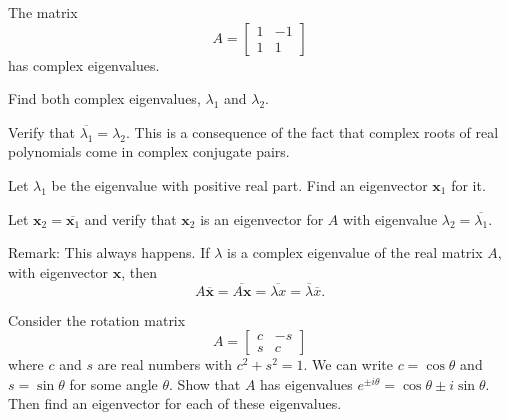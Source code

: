 \documentclass[minion]{homework}
\newcommand{\vx}{\mathbf{x}}
\begin{document}
\begin{aproblems}
\aproblem
The matrix
\[
A= \begin{bmatrix} 1 & -1 \\ 1 & 1 \end{bmatrix}
\]
has complex eigenvalues.
\begin{subproblems}
\item Find both complex eigenvalues, $\lambda_1$ and $\lambda_2$.
\item Verify that $\overline{\lambda_1}=\lambda_2$.  This 
is a consequence of the fact that complex roots of real polynomials come in complex conjugate pairs.  
\item Let $\lambda_1$ be the eigenvalue with positive real part.  Find
an eigenvector $\vx_1$ for it.
\item Let $\vx_2=\overline{\vx_1}$ and verify that $\vx_2$ is an eigenvector 
for $A$ with eigenvalue $\lambda_2=\overline{\lambda_1}$.

Remark: This always happens.  If $\lambda$ is a complex eigenvalue of the real matrix $A$, with eigenvector $\vx$, then 
\[
A\overline{\vx} = \overline{A\vx} = \overline{\lambda x} = \overline{\lambda} \overline{x}.
\]
\end{subproblems}

\aproblem Consider the rotation matrix
\[
A= \begin{bmatrix} c & -s \\ s & c \end{bmatrix}
\]
where $c$ and $s$ are real numbers with $c^2+s^2=1$.  We
can write $c=\cos\theta$ and $s=\sin\theta$ for some angle $\theta$.
Show that $A$ has eigenvalues $e^{\pm i\theta}=\cos\theta\pm i\sin\theta$.
Then find an eigenvector for each of these eigenvalues.
\end{aproblems}
\end{document}
